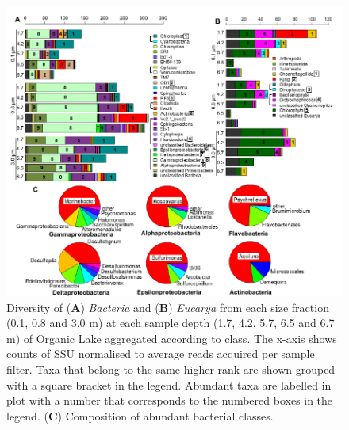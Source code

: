 \begin{figure}
\includegraphics{orglake_figures/genus_barplots.pdf}
\caption[Diversity of \emph{Bacteria} and \emph{Eucarya} in Organic Lake]{Diversity of (\textbf{A}) \emph{Bacteria} and (\textbf{B}) \emph{Eucarya} from each size fraction (0.1, 0.8 and 3.0 \textmu{}m) at each sample depth (1.7, 4.2, 5.7, 6.5 and 6.7 m) of Organic Lake aggregated according to class. The x-axis shows counts of \ac{SSU} normalised to average reads acquired per sample filter. Taxa that belong to the same higher rank are shown grouped with a square bracket in the legend. Abundant taxa are labelled in plot with a number that corresponds to the numbered boxes in the legend. (\textbf{C}) Composition of abundant bacterial classes.}
\label{fig:genus_barplots}

\end{figure}
